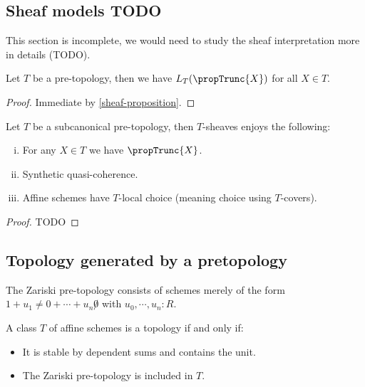 \subsection{Sheaf models TODO}

This section is incomplete, we would need to study the sheaf interpretation more in details (TODO).

\begin{lemma}\label{cover-are-surjective}
Let $T$ be a pre-topology, then we have $L_T(\propTrunc{X})$ for all $X\in T$.
\end{lemma}

\begin{proof}
Immediate by \cref{sheaf-proposition}.
\end{proof}

\begin{theorem}\label{sheaves-internal}
Let $T$ be a subcanonical pre-topology, then $T$-sheaves enjoys the following:
\begin{enumerate}[(i)]
\item For any $X\in T$ we have $\propTrunc{X}$.
\item Synthetic quasi-coherence.
\item Affine schemes have $T$-local choice (meaning choice using $T$-covers).
\end{enumerate}
\end{theorem}

\begin{proof}
TODO
\end{proof}


\subsection{Topology generated by a pretopology}

\begin{definition}
The Zariski pre-topology consists of schemes merely of the form $1+u_1\not=0+\cdots+u_n\not0$ with $u_0,\cdots,u_n:R$.
\end{definition}

\begin{lemma}
A class $T$ of affine schemes is a topology if and only if:
\begin{itemize}
\item It is stable by dependent sums and contains the unit.
\item The Zariski pre-topology is included in $T$.
\end{itemize}
\end{lemma}

